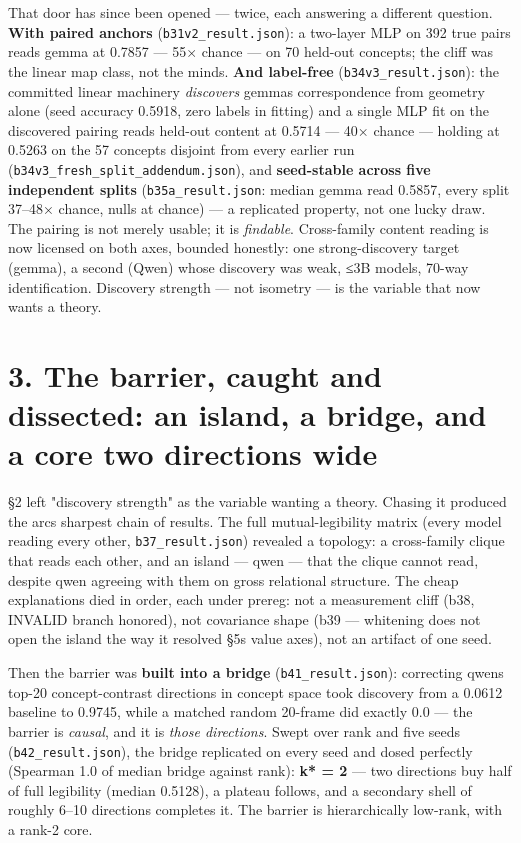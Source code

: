 \documentclass[11pt]{article}
\begin{document}
That door has since been opened --- twice, each answering a different question. \textbf{With paired anchors} (\texttt{b31v2\_result.json}): a two-layer MLP on 392 true pairs reads gemma at 0.7857 --- 55× chance --- on 70 held-out concepts; the cliff was the linear map class, not the minds. \textbf{And label-free} (\texttt{b34v3\_result.json}): the committed linear machinery \emph{discovers} gemma\textquotesingle s correspondence from geometry alone (seed accuracy 0.5918, zero labels in fitting) and a single MLP fit on the discovered pairing reads held-out content at 0.5714 --- 40× chance --- holding at 0.5263 on the 57 concepts disjoint from every earlier run (\texttt{b34v3\_fresh\_split\_addendum.json}), and \textbf{seed-stable across five independent splits} (\texttt{b35a\_result.json}: median gemma read 0.5857, every split 37--48× chance, nulls at chance) --- a replicated property, not one lucky draw. The pairing is not merely usable; it is \emph{findable}. Cross-family content reading is now licensed on both axes, bounded honestly: one strong-discovery target (gemma), a second (Qwen) whose discovery was weak, ≤3B models, 70-way identification. Discovery strength --- not isometry --- is the variable that now wants a theory.

\section{3. The barrier, caught and dissected: an island, a bridge, and a core two directions wide}\label{3-the-barrier-caught-and-dissected-an-island-a-bridge-and-a-core-two-directions-wide}

§2 left "discovery strength" as the variable wanting a theory. Chasing it produced the arc\textquotesingle s sharpest chain of results. The full mutual-legibility matrix (every model reading every other, \texttt{b37\_result.json}) revealed a topology: a cross-family clique that reads each other, and an island --- qwen --- that the clique cannot read, despite qwen agreeing with them on gross relational structure. The cheap explanations died in order, each under prereg: not a measurement cliff (b38, INVALID branch honored), not covariance shape (b39 --- whitening does not open the island the way it resolved §5\textquotesingle s value axes), not an artifact of one seed.

Then the barrier was \textbf{built into a bridge} (\texttt{b41\_result.json}): correcting qwen\textquotesingle s top-20 concept-contrast directions in concept space took discovery from a 0.0612 baseline to 0.9745, while a matched random 20-frame did exactly 0.0 --- the barrier is \emph{causal}, and it is \emph{those directions}. Swept over rank and five seeds (\texttt{b42\_result.json}), the bridge replicated on every seed and dosed perfectly (Spearman 1.0 of median bridge against rank): \textbf{k* = 2} --- two directions buy half of full legibility (median 0.5128), a plateau follows, and a secondary shell of roughly 6--10 directions completes it. The barrier is hierarchically low-rank, with a rank-2 core.
\end{document}
